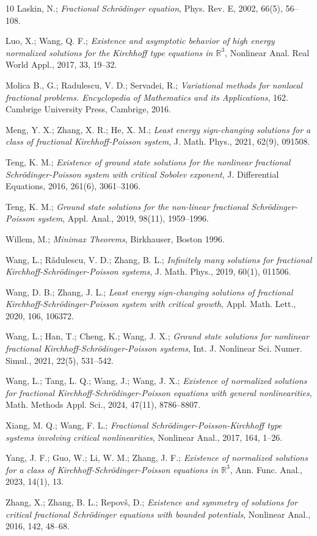 \documentclass[reqno]{amsart}
\begin{document}
\begin{thebibliography}{10}
  Laskin, N.;
\emph{Fractional Schr\"odinger equation}, Phys. Rev. E, 2002, 66(5), 56--108.

  Luo, X.;  Wang, Q. F.;
\emph{Existence and asymptotic behavior of high energy normalized solutions for 
the Kirchhoff type equations in $\mathbb{R}^3$},
 Nonlinear Anal. Real World Appl., 2017, 33, 19--32.

  Molica B., G.; Radulescu, V. D.; Servadei, R.;
\emph{Variational methods for nonlocal fractional problems. Encyclopedia of 
Mathematics and its Applications}, 162. Cambrige University Press, Cambrige, 2016.

   Meng, Y. X.; Zhang, X. R.; He, X. M.;
\emph{Least energy sign-changing solutions for a class of fractional Kirchhoff-Poisson 
system}, J. Math. Phys., 2021, 62(9), 091508.

 Teng, K. M.;
\emph{Existence of ground state solutions for the nonlinear fractional 
Schr\"odinger-Poisson system with critical Sobolev exponent},
J. Differential Equations, 2016, 261(6),  3061--3106.

  Teng, K. M.;
\emph{Ground state solutions for the non-linear fractional Schr\"odinger-Poisson system},
Appl. Anal., 2019, 98(11),  1959--1996.

  Willem, M.;
\emph{Minimax Theorems}, Birkhauser, Boston 1996.

  Wang, L.; R\v{a}dulescu, V. D.; Zhang, B. L.;
\emph{Infinitely many solutions for fractional Kirchhoff-Schr\"odinger-Poisson systems},
J. Math. Phys., 2019, 60(1), 011506.

  Wang, D. B.; Zhang, J. L.;
\emph{Least energy sign-changing solutions of fractional Kirchhoff-Schr\"odinger-Poisson 
system with critical growth}, Appl. Math. Lett., 2020,  106, 106372.

  Wang, L.;  Han, T.;  Cheng, K.; Wang, J. X.;
\emph{Ground state solutions for nonlinear fractional Kirchhoff-Schr\"odinger-Poisson 
systems}, Int. J. Nonlinear Sci. Numer. Simul., 2021,  22(5), 531--542.

 Wang, L.; Tang, L. Q.; Wang, J.; Wang, J. X.;
\emph{Existence of normalized solutions for fractional Kirchhoff-Schr\"odinger-Poisson 
equations with general nonlinearities},
 Math. Methods Appl. Sci., 2024, 47(11), 8786--8807.

 Xiang, M. Q.; Wang, F. L.;
\emph{Fractional Schr\"odinger-Poisson-Kirchhoff type systems involving critical 
nonlinearities}, Nonlinear Anal., 2017, 164, 1--26.

 Yang, J. F.; Guo, W.; Li, W. M.; Zhang, J. F.;
\emph{Existence of normalized solutions for a class of Kirchhoff-Schr\"odinger-Poisson 
equations in $\mathbb{R}^3$}, Ann. Func. Anal., 2023, 14(1), 13.

 Zhang, X.; Zhang, B. L.; Repov\v{s}, D.;
\emph{Existence and symmetry of solutions for critical fractional Schr\"odinger
 equations with bounded potentials}, Nonlinear Anal., 2016, 142, 48--68.

\end{thebibliography}
\end{document}
